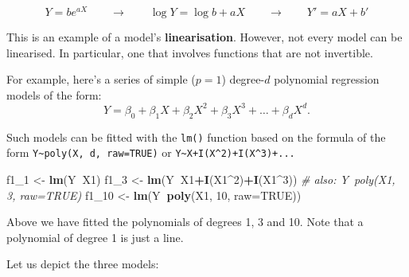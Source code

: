 \documentclass[10pt,b5paper,krantz1]{krantz}
\newenvironment{Shaded}{\begin{snugshade}}{\end{snugshade}}
\newcommand{\CommentTok}[1]{\textcolor[rgb]{0.37,0.37,0.37}{\textit{#1}}}
\newcommand{\DataTypeTok}[1]{\textcolor[rgb]{0.27,0.27,0.27}{#1}}
\newcommand{\DecValTok}[1]{\textcolor[rgb]{0.06,0.06,0.06}{#1}}
\newcommand{\KeywordTok}[1]{\textcolor[rgb]{0.27,0.27,0.27}{\textbf{#1}}}
\newcommand{\NormalTok}[1]{#1}
\newcommand{\OperatorTok}[1]{\textcolor[rgb]{0.43,0.43,0.43}{\textbf{#1}}}
\newcommand{\OtherTok}[1]{\textcolor[rgb]{0.37,0.37,0.37}{#1}}
\newcommand{\StringTok}[1]{\textcolor[rgb]{0.5,0.5,0.5}{#1}}
\begin{document}
\[
Y = b e^{aX} \qquad \to \qquad \log Y = \log b + aX \qquad\to\qquad Y'=aX+b'
\]

This is an example of a model's \textbf{linearisation}.
However, not every model can be linearised.
In particular, one that involves functions that are not invertible.

For example, here's a series of simple (\(p=1\)) degree-\(d\)
polynomial regression models
of the form:
\[
Y = \beta_0 + \beta_1 X + \beta_2 X^2 + \beta_3 X^3 + \dots + \beta_d X^d.
\]

Such models can be fitted with the \texttt{lm()} function based on the formula
of the form \texttt{Y\textasciitilde{}poly(X,\ d,\ raw=TRUE)} or \texttt{Y\textasciitilde{}X+I(X\^{}2)+I(X\^{}3)+...}

\begin{Shaded}
\begin{Highlighting}[]
\NormalTok{f1_}\DecValTok{1}\NormalTok{  <-}\StringTok{ }\KeywordTok{lm}\NormalTok{(Y}\OperatorTok{~}\NormalTok{X1)}
\NormalTok{f1_}\DecValTok{3}\NormalTok{  <-}\StringTok{ }\KeywordTok{lm}\NormalTok{(Y}\OperatorTok{~}\NormalTok{X1}\OperatorTok{+}\KeywordTok{I}\NormalTok{(X1}\OperatorTok{^}\DecValTok{2}\NormalTok{)}\OperatorTok{+}\KeywordTok{I}\NormalTok{(X1}\OperatorTok{^}\DecValTok{3}\NormalTok{)) }\CommentTok{# also: Y~poly(X1, 3, raw=TRUE)}
\NormalTok{f1_}\DecValTok{10}\NormalTok{ <-}\StringTok{ }\KeywordTok{lm}\NormalTok{(Y}\OperatorTok{~}\KeywordTok{poly}\NormalTok{(X1, }\DecValTok{10}\NormalTok{, }\DataTypeTok{raw=}\OtherTok{TRUE}\NormalTok{))}
\end{Highlighting}
\end{Shaded}

Above we have fitted the polynomials of degrees 1, 3 and 10.
Note that a polynomial of degree 1 is just a line.

Let us depict the three models:

\begin{Shaded}
\end{Shaded}
\end{document}
